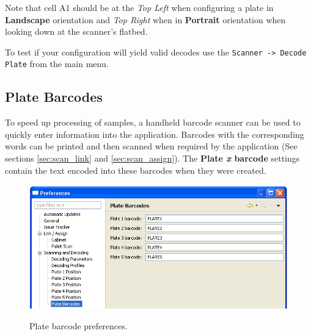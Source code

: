 Note that cell A1 should be at the \emph{Top Left} when configuring a plate in
\textbf{Landscape} orientation and \emph{Top Right} when in \textbf{Portrait}
orientation when looking down at the scanner's flatbed.

To test if your configuration will yield valid decodes use the
\texttt{Scanner -> Decode Plate} from the main menu.
\subsection{Plate Barcodes}
To speed up processing of samples, a handheld barcode scanner can be used to
quickly enter information into the application. Barcodes with the corresponding
words can be printed and then scanned when required by the application (See
sections \ref{sec:scan_link} and \ref{sec:scan_assign}). The \textbf{Plate
  \emph{x} barcode} settings contain the text encoded into these barcodes when
they were created.
    \begin{figure}[H]
      \centering
      \scalebox{0.45}
      { \includegraphics*{screenshots/configuration/prefs_plate_barcodes} }
      \caption{Plate barcode preferences.}
      \label{fig:prefs_plate_barcodes}
    \end{figure}


